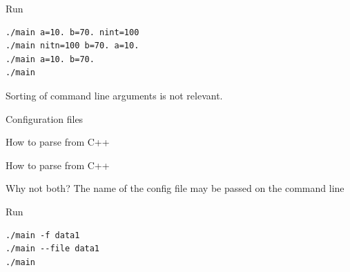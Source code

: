 \documentclass[10pt]{beamer}
\begin{document}

\begin{frame}[fragile]{Run}

    \begin{verbatim}
./main a=10. b=70. nint=100
./main nitn=100 b=70. a=10.
./main a=10. b=70.
./main
    \end{verbatim}

    \vspace{1cm}
    
   	Sorting of command line arguments is not relevant.

\end{frame}


\begin{frame}[fragile]{Configuration files}
    
\end{frame}


\begin{frame}[fragile]{How to parse from C++}
    
\end{frame}


\begin{frame}[fragile]{How to parse from C++}
    
\end{frame}


\begin{frame}[fragile]{Why not both?}
    The name of the config file may be passed on the command line
        
    
\end{frame}


\begin{frame}[fragile]{Run}
    \begin{verbatim}
./main -f data1
./main --file data1
./main
    \end{verbatim}
\end{frame}
\end{document}
